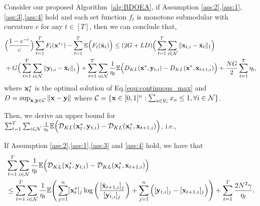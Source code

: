 		\begin{lemma}\label{lemma::4} 
			Consider our proposed Algorithm~\ref{alg:BDOEA}, if Assumption \ref{ass:2},\ref{ass:1},\ref{ass:3},\ref{ass:4} hold and each set function $f_{t}$ is monotone submodular with curvature $c$ for any $t\in[T]$, then we can conclude that,
		\begin{equation*}
			\begin{aligned}
				&\Big(\frac{1-e^{-c}}{c}\Big)\sum_{t=1}^{T}F_{t}(\mathbf{x}^{*_{t}})-\sum_{t=1}^{T}\mathbb{E}\Big(F_{t}(\bar{\mathbf{x}}_{t})\Big)\le(2G+LD)\Big(\sum_{t=1}^{T}\sum_{i\in\mathcal{N}}\|\mathbf{x}_{t,i}-\bar{\mathbf{x}}_{t}\|_{1}\Big)\\&+G\Big(\sum_{t=1}^{T}\sum_{i\in\mathcal{N}}\|\mathbf{y}_{t,i}-\bar{\mathbf{x}}_{t}\|_{1}\Big)+\sum_{t=1}^{T}\sum_{i\in\mathcal{N}}\frac{1}{\eta_{t}}\mathbb{E}\Big(D_{KL}(\mathbf{x}^{*},\mathbf{y}_{t,i})-D_{KL}(\mathbf{x}^{*},\mathbf{x}_{t+1,i})\Big)+\frac{NG}{2}\sum_{t=1}^{T}\eta_{t},
			\end{aligned}
		\end{equation*} where $\mathbf{x}_{t}^{*}$ is the optimal solution of Eq.\eqref{equ:continuous_max} and $D=\sup_{\mathbf{x},\mathbf{y}\in\mathcal{C}}\|\mathbf{x}-\mathbf{y}\|$ where $\mathcal{C}=\{\mathbf{x}\in[0,1]^{n}: \sum_{a\in\mathcal{V}_{i}}x_{a}\le1,\forall i\in\mathcal{N}\}$.
	\end{lemma}
	Then, we derive an upper bound for  $\sum_{t=1}^{T}\sum_{i\in\mathcal{N}}\frac{1}{\eta_{t}}\mathbb{E}\Big(\mathcal{D}_{KL}(\mathbf{x}^{*}_{t},\mathbf{y}_{t,i})-\mathcal{D}_{KL}(\mathbf{x}^{*}_{t},\mathbf{x}_{t+1,i})\Big)$, i.e., 
		\begin{lemma}\label{lemma::5} 
				If Assumption \ref{ass:2},\ref{ass:1},\ref{ass:3} and \ref{ass:4} hold, we have that
		\begin{equation*}
			\begin{aligned}
			&\sum_{t=1}^{T}\sum_{i\in\mathcal{N}}\frac{1}{\eta_{t}}\mathbb{E}\Big(\mathcal{D}_{KL}(\mathbf{x}^{*}_{t},\mathbf{y}_{t,i})-\mathcal{D}_{KL}(\mathbf{x}^{*}_{t},\mathbf{x}_{t+1,i})\Big)\\&\le\sum_{t=1}^{T}\sum_{i\in\mathcal{N}}\frac{1}{\eta_{t}}\mathbb{E}\Bigg(\sum_{j=1}^{n}[\mathbf{x}_{t}^{*}]_{j}\log\left(\frac{[\hat{\mathbf{x}}_{t+1,i}]_{j}}{[\mathbf{y}_{t,i}]_{j}}\right)+\sum_{j=1}^{n}\Big([\mathbf{y}_{t,i}]_{j}-[\mathbf{x}_{t+1,i}]_{j}\Big)\Bigg)+\sum_{t=1}^{T}\frac{2N^{2}\gamma}{\eta_{t}}.
			\end{aligned}
		\end{equation*}
	\end{lemma}
